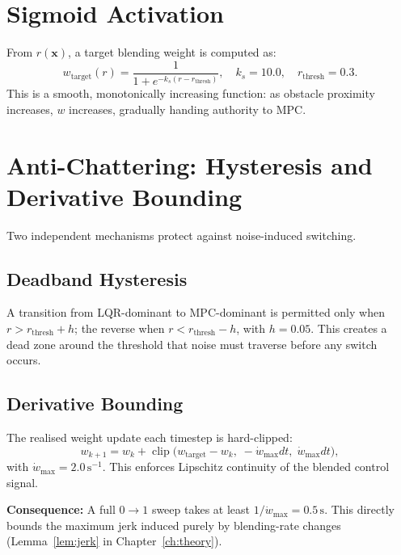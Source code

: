 \documentclass[12pt,a4paper,oneside]{report}
\begin{document}
\section{Sigmoid Activation}

From \(r(\mathbf{x})\), a target blending weight is computed as:
\begin{equation}\label{eq:sigmoid}
  w_{\mathrm{target}}(r) =
    \frac{1}{1+e^{-k_s(r-r_{\mathrm{thresh}})}},\quad
  k_s=10.0,\quad r_{\mathrm{thresh}}=0.3.
\end{equation}
This is a smooth, monotonically increasing function: as obstacle proximity
increases, \(w\) increases, gradually handing authority to MPC.

\section{Anti-Chattering: Hysteresis and Derivative Bounding}

Two independent mechanisms protect against noise-induced switching.

\subsection{Deadband Hysteresis}

A transition from LQR-dominant to MPC-dominant is permitted only when
\(r > r_{\mathrm{thresh}} + h\); the reverse when
\(r < r_{\mathrm{thresh}} - h\), with \(h=0.05\). This creates a dead
zone around the threshold that noise must traverse before any switch occurs.

\subsection{Derivative Bounding}

The realised weight update each timestep is hard-clipped:
\begin{equation}\label{eq:clip}
  w_{k+1} = w_k + \operatorname{clip}
    \!\bigl(w_{\mathrm{target}}-w_k,\;
     -\dot{w}_{\max}dt,\;\dot{w}_{\max}dt\bigr),
\end{equation}
with \(\dot{w}_{\max}=2.0\,\text{s}^{-1}\). This enforces Lipschitz
continuity of the blended control signal.

\textbf{Consequence:} A full \(0\to1\) sweep takes at least
\(1/\dot{w}_{\max}=0.5\,\text{s}\). This directly bounds the maximum jerk
induced purely by blending-rate changes (Lemma~\ref{lem:jerk} in
Chapter~\ref{ch:theory}).
\end{document}
